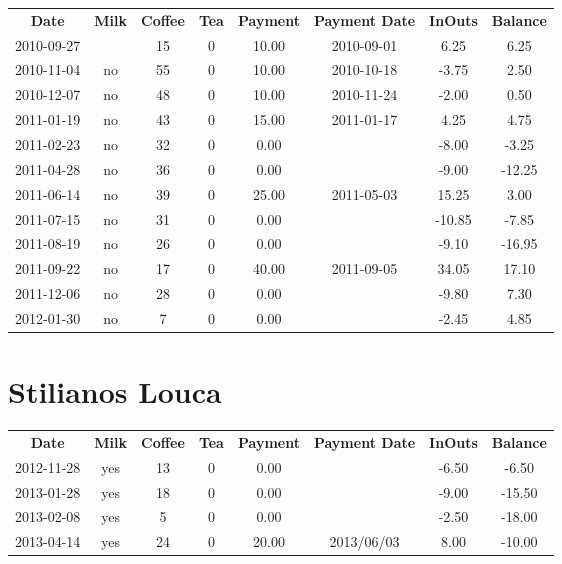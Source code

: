 \begin{center}
\begin{tabular}{cccccccc}
\textbf{Date} & \textbf{Milk} & \textbf{Coffee} & \textbf{Tea} & \textbf{Payment} & \textbf{Payment Date} & \textbf{InOuts} & \textbf{Balance} \\
2010-09-27 &  & 15 & 0 & 10.00 & 2010-09-01 &   6.25 &   6.25\\ 
2010-11-04 & no & 55 & 0 & 10.00 & 2010-10-18 &  -3.75 &   2.50\\ 
2010-12-07 & no & 48 & 0 & 10.00 & 2010-11-24 &  -2.00 &   0.50\\ 
2011-01-19 & no & 43 & 0 & 15.00 & 2011-01-17 &   4.25 &   4.75\\ 
2011-02-23 & no & 32 & 0 &  0.00 &  &  -8.00 &  -3.25\\ 
2011-04-28 & no & 36 & 0 &  0.00 &  &  -9.00 & -12.25\\ 
2011-06-14 & no & 39 & 0 & 25.00 & 2011-05-03 &  15.25 &   3.00\\ 
2011-07-15 & no & 31 & 0 &  0.00 &  & -10.85 &  -7.85\\ 
2011-08-19 & no & 26 & 0 &  0.00 &  &  -9.10 & -16.95\\ 
2011-09-22 & no & 17 & 0 & 40.00 & 2011-09-05 &  34.05 &  17.10\\ 
2011-12-06 & no & 28 & 0 &  0.00 &  &  -9.80 &   7.30\\ 
2012-01-30 & no &  7 & 0 &  0.00 &  &  -2.45 &   4.85
\end{tabular}
\end{center}

\section{Stilianos Louca}

\begin{center}
\begin{tabular}{cccccccc}
\textbf{Date} & \textbf{Milk} & \textbf{Coffee} & \textbf{Tea} & \textbf{Payment} & \textbf{Payment Date} & \textbf{InOuts} & \textbf{Balance} \\
2012-11-28 & yes & 13 & 0 &  0.00 &  & -6.50 &  -6.50\\ 
2013-01-28 & yes & 18 & 0 &  0.00 &  & -9.00 & -15.50\\ 
2013-02-08 & yes &  5 & 0 &  0.00 &  & -2.50 & -18.00\\ 
2013-04-14 & yes & 24 & 0 & 20.00 & 2013/06/03 &  8.00 & -10.00
\end{tabular}
\end{center}

